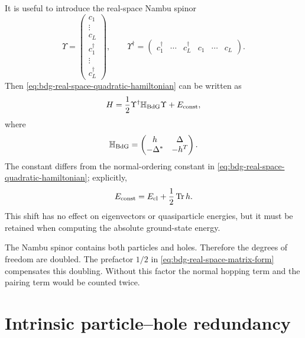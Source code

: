 It is useful to introduce the real-space Nambu spinor
\begin{equation}
\label{eq:bdg-real-space-nambu-spinor}
    \Upsilon
    =
    \begin{pmatrix}
        c_1\\
        \vdots\\
        c_L\\
        c_1^\dagger\\
        \vdots\\
        c_L^\dagger
    \end{pmatrix},
    \qquad
    \Upsilon^\dagger
    =
    \begin{pmatrix}
        c_1^\dagger&\cdots&c_L^\dagger&c_1&\cdots&c_L
    \end{pmatrix}.
\end{equation}
Then \cref{eq:bdg-real-space-quadratic-hamiltonian} can be written as
\begin{equation}
\label{eq:bdg-real-space-matrix-form}
    H
    =
    \frac12\Upsilon^\dagger\mathbb{H}_{\rm BdG}\Upsilon
    +E_{\rm const},
\end{equation}
where
\begin{equation}
\label{eq:bdg-real-space-matrix}
    \mathbb{H}_{\rm BdG}
    =
    \begin{pmatrix}
        h & \Delta\\
        -\Delta^* & -h^T
    \end{pmatrix}.
\end{equation}
The constant differs from the normal-ordering constant in
\cref{eq:bdg-real-space-quadratic-hamiltonian}; explicitly,
\begin{equation}
    E_{\rm const}=E_{\rm cl}+\frac12\operatorname{Tr} h.
\end{equation}
This shift has no effect on eigenvectors or quasiparticle energies, but it must
be retained when computing the absolute ground-state energy.

\begin{remark}
The Nambu spinor contains both particles and holes.  Therefore the degrees of
freedom are doubled.  The prefactor $1/2$ in
\cref{eq:bdg-real-space-matrix-form} compensates this doubling.  Without this
factor the normal hopping term and the pairing term would be counted twice.
\end{remark}

\section{Intrinsic particle--hole redundancy}

